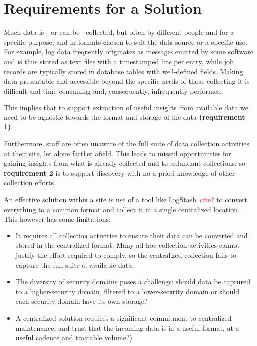 \section{Requirements for a Solution}
\label{s:requirements}


Much data is - or can be - collected, but often by different
people and for a specific purpose, and in formats chosen to suit the 
data source or a specific use.
For example, log data frequently originates 
as messages emitted by some software and is thus stored as
text files with a timestamped line per entry, while job records
are typically stored in database tables with well-defined fields.
Making data presentable and accessible beyond the specific needs of those
collecting it is difficult and time-consuming and, consequently, 
infrequently performed. 

This implies that to support extraction of useful insights from available data 
we need to be agnostic towards the format and storage of the data
\textbf{(requirement 1)}.

Furthermore, staff are often unaware of the full suite of data collection 
activities at their site, let alone farther afield. This leads to missed 
opportunities for gaining insights from what is already collected and 
to redundant collections, so \textbf{requirement 2} is to support 
discovery with no a priori knowledge of other collection efforts.

An effective solution within a site is 
use of a tool like LogStash~\textcolor{red}{cite?} 
to convert everything to a common format and collect it in a single 
centralized location. This however has some limitations:

\begin{itemize}
\item It requires all collection activities to ensure their data can
      be converted and stored in the centralized format. Many ad-hoc
      collection activities cannot justify the effort required to 
      comply, so the centralized collection fails to capture the full
      suite of available data.
\item The diversity of security domains poses a challenge: should data
      be captured to a higher-security domain, filtered to a lower-security
      domain or should each security domain have its own storage?
\item A centralized solution requires a significant commitment to
      centralized maintenance, and trust that the incoming data is 
      in a useful format, at a useful cadence and
      tractable volume?)
\end{itemize}

